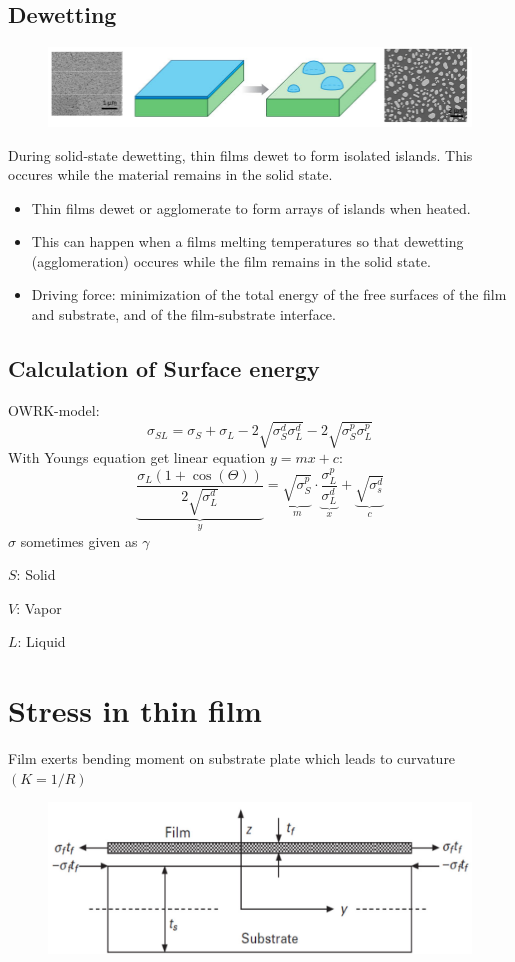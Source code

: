 \subsection{Dewetting}
\begin{figure}[h]
    \centering
    \includegraphics[width=\columnwidth]{images/dewetting.png}
    \label{fig:dewetting}
\end{figure}
During solid-state dewetting, thin films dewet to form isolated islands. This occures while the material remains in the solid state.
\begin{itemize}
    \item Thin films dewet or agglomerate to form arrays of islands when heated.
    \item This can happen when a films melting temperatures so that dewetting (agglomeration) occures while the film remains in the solid state.
    \item Driving force: minimization of the total energy of the free surfaces of the film and substrate, and of the film-substrate interface.
\end{itemize}

\subsection{Calculation of Surface energy}
OWRK-model:
\[
\sigma_{SL} = \sigma_{S} + \sigma_{L} - 2\sqrt{\sigma_S^d\sigma_L^d} - 2\sqrt{\sigma_S^p\sigma_L^p}
\]
With Youngs equation get linear equation \(y = mx + c\):
\[
\underbrace{\frac{\sigma_L (1+\cos(\Theta))}{2\sqrt{\sigma_L^d}}}_{y} 
= 
\underbrace{\sqrt{\sigma_S^p}}_{m}
\cdot
\underbrace{\frac{\sigma_L^p}{\sigma_L^d}}_{x} 
+ 
\underbrace{\sqrt{\sigma_s^d}}_{c}
\]
\(\sigma\) sometimes given as \(\gamma\)

\(S\): Solid

\(V\): Vapor

\(L\): Liquid

\section{Stress in thin film}
Film exerts bending moment on substrate plate which leads to curvature \((K = 1/R)\)
\begin{figure}[h]
    \centering
    \includegraphics[width=\columnwidth]{images/stoney.png}
    \label{fig:stoney}
\end{figure}

